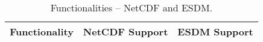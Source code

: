 \begin{table}[H]
\centering
\begin{tabular}{|l|m{6cm}|l|}
\hline
Functionality & NetCDF Support & ESDM Support \\ \hline \hline

\end{tabular}
\caption{Functionalities -- NetCDF and ESDM.}
\end{table}
